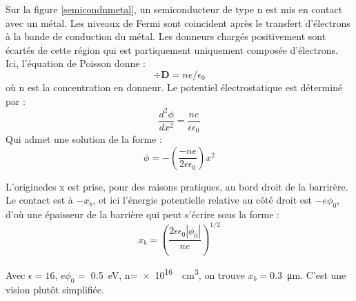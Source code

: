 Sur la figure \ref{semicondnmetal}, un semiconducteur de type n est mis en
contact avec un métal. Les niveaux de Fermi sont coincident après le transfert
d'électrons à la bande de conduction du métal. Les donneurs chargés positivement
sont écartés de cette région qui est partiquement uniquement composée
d'électrons. Ici, l'équation de Poisson  donne :
\begin{equation}
    \div \mathbf{D} = ne/\epsilon_0
\end{equation}
où n est la concentration en donneur. Le potentiel électrostatique est déterminé
par :
\begin{equation}
    \frac{d^2\phi}{dx^2} = \frac{ne}{\epsilon \epsilon_0}
\end{equation}
Qui admet une solution de la forme :
\begin{equation}
    \phi = -(\frac{-ne}{2\epsilon \epsilon_0})x^2
\end{equation}

L'originedes x est prise, pour des raisons pratiques, au bord droit de la
barrirère. Le contact est à $-x_b$, et ici l'énergie potentielle relative au côté
droit est $-e\phi_0$, d'où une épaisseur de la barrière qui peut s'écrire sous la
forme :
\begin{equation}
    x_b = \left(\frac{2\epsilon \epsilon_0 |\phi_0|}{ne}\right)^{1/2}
\end{equation}

Avec $\epsilon = 16$, $e\phi_0 =$ \SI{0.5}{\electronvolt},
n=\SI{e16}{\per\cubic\centi\metre}, on trouve $x_b = $\SI{0.3}{\micro\metre}.
C'est une vision plutôt simplifiée.
